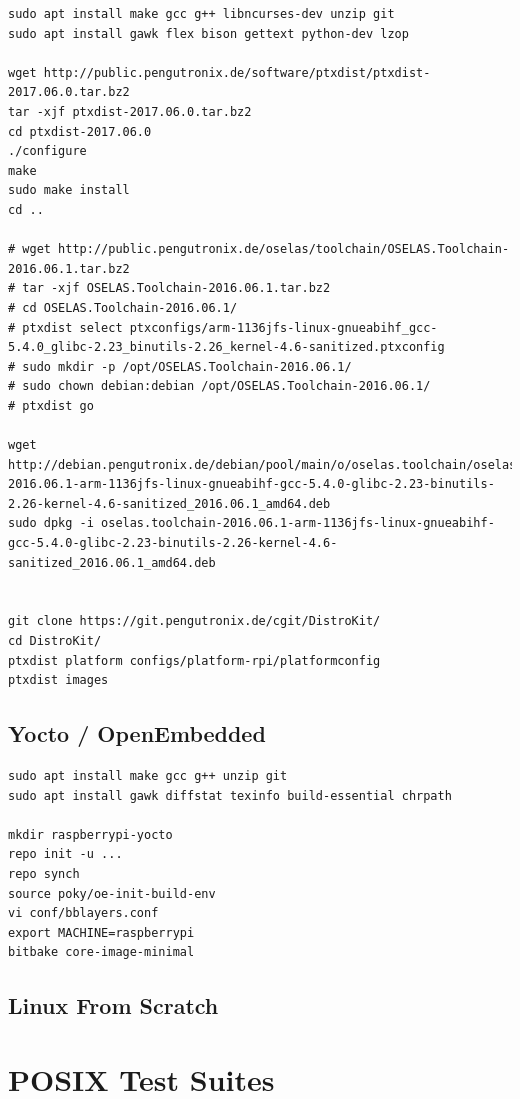 \documentclass[printmode]{mgr}
\begin{document}
\begin{lstlisting}
sudo apt install make gcc g++ libncurses-dev unzip git
sudo apt install gawk flex bison gettext python-dev lzop

wget http://public.pengutronix.de/software/ptxdist/ptxdist-2017.06.0.tar.bz2
tar -xjf ptxdist-2017.06.0.tar.bz2
cd ptxdist-2017.06.0
./configure
make
sudo make install
cd ..

# wget http://public.pengutronix.de/oselas/toolchain/OSELAS.Toolchain-2016.06.1.tar.bz2
# tar -xjf OSELAS.Toolchain-2016.06.1.tar.bz2
# cd OSELAS.Toolchain-2016.06.1/
# ptxdist select ptxconfigs/arm-1136jfs-linux-gnueabihf_gcc-5.4.0_glibc-2.23_binutils-2.26_kernel-4.6-sanitized.ptxconfig
# sudo mkdir -p /opt/OSELAS.Toolchain-2016.06.1/
# sudo chown debian:debian /opt/OSELAS.Toolchain-2016.06.1/
# ptxdist go

wget http://debian.pengutronix.de/debian/pool/main/o/oselas.toolchain/oselas.toolchain-2016.06.1-arm-1136jfs-linux-gnueabihf-gcc-5.4.0-glibc-2.23-binutils-2.26-kernel-4.6-sanitized_2016.06.1_amd64.deb
sudo dpkg -i oselas.toolchain-2016.06.1-arm-1136jfs-linux-gnueabihf-gcc-5.4.0-glibc-2.23-binutils-2.26-kernel-4.6-sanitized_2016.06.1_amd64.deb


git clone https://git.pengutronix.de/cgit/DistroKit/
cd DistroKit/
ptxdist platform configs/platform-rpi/platformconfig
ptxdist images
\end{lstlisting}

\subsection{Yocto / OpenEmbedded}

\begin{lstlisting}
sudo apt install make gcc g++ unzip git
sudo apt install gawk diffstat texinfo build-essential chrpath

mkdir raspberrypi-yocto
repo init -u ...
repo synch
source poky/oe-init-build-env
vi conf/bblayers.conf
export MACHINE=raspberrypi
bitbake core-image-minimal
\end{lstlisting}

\subsection{Linux From Scratch}

\section{POSIX Test Suites}
\end{document}
